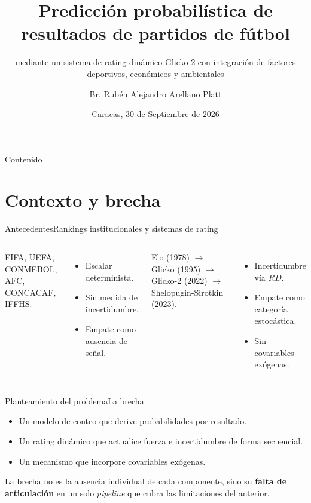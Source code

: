 \documentclass[aspectratio=169,11pt]{beamer}
\title{Predicci\'on probabil\'istica de resultados de partidos de f\'utbol}
\subtitle{mediante un sistema de rating din\'amico Glicko-2 con integraci\'on de factores deportivos, econ\'omicos y ambientales}
\author[Rub\'en Arellano]{Br. Rub\'en Alejandro Arellano Platt}
\institute{Escuela de Matemática\\Facultad de Ciencias · UCV}
\date{Caracas, 30 de Septiembre de 2026}
\begin{document}
\begin{frame}
  \titlepage
\end{frame}

\begin{frame}{Contenido}
  \scriptsize
  \tableofcontents[hideallsubsections]
\end{frame}

\section{Contexto y brecha}

\begin{frame}{Antecedentes}{Rankings institucionales y sistemas de rating}
	\begin{columns}[T,onlytextwidth]
		\par\vskip 2mm
		\footnotesize
		FIFA, UEFA, CONMEBOL, AFC, CONCACAF, IFFHS.
		\begin{itemize}
			\item Escalar determinista.
			\item Sin medida de incertidumbre.
			\item Empate como ausencia de se\~nal.
		\end{itemize}
		\par\vskip 2mm
		\footnotesize
		Elo (1978) $\to$ Glicko (1995) $\to$ Glicko-2 (2022) $\to$ Shelopugin-Sirotkin (2023).
		\begin{itemize}
			\item Incertidumbre v\'ia $RD$.
			\item Empate como categor\'ia estoc\'astica.
			\item Sin covariables ex\'ogenas.
		\end{itemize}
	\end{columns}
	\vfill
\end{frame}

\begin{frame}[t]{Planteamiento del problema}{La brecha}
	\small
	\begin{itemize}
		\item Un modelo de conteo que derive probabilidades por resultado.
		\item Un rating din\'amico que actualice fuerza e incertidumbre de forma secuencial.
		\item Un mecanismo que incorpore covariables ex\'ogenas.
	\end{itemize}
	\vskip 1mm
	La brecha no es la ausencia individual de cada componente, sino su \textbf{falta de articulaci\'on} en un solo \textit{pipeline} que cubra las limitaciones del anterior.
\end{frame}
\end{document}
